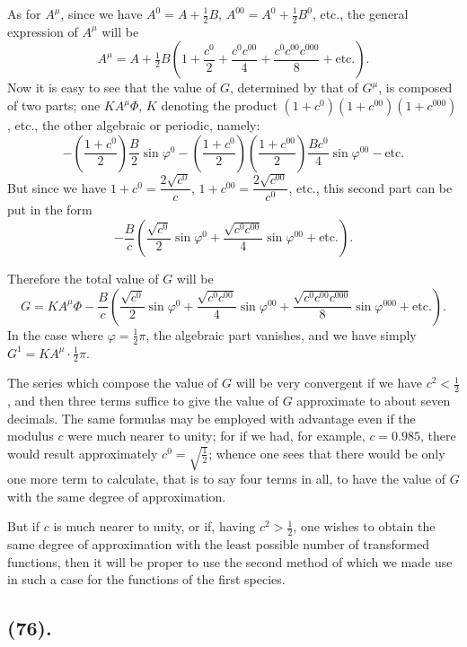 \documentclass{article}
\begin{document}
As for $A^{\mu}$, since we have $A^{0}=A+\frac{1}{2}B$, $A^{00}=A^{0}+\frac{1}{2}B^{0}$, etc., the general expression of $A^{\mu}$ will be
\[ A^{\mu}=A+\tfrac{1}{2}B\left(1+\frac{c^{0}}{2}+\frac{c^{0}c^{00}}{4}+\frac{c^{0}c^{00}c^{000}}{8}+\text{etc.}\right). \]
Now it is easy to see that the value of $G$, determined by that of $G^{\mu}$, is composed of two parts; one $KA^{\mu}\Phi$, $K$ denoting the product $(1+c^{0})(1+c^{00})(1+c^{000})$, etc., the other algebraic or periodic, namely:
\[ -\left(\frac{1+c^{0}}{2}\right)\frac{B}{2}\sin\varphi^{0}-\left(\frac{1+c^{0}}{2}\right)\left(\frac{1+c^{00}}{2}\right)\frac{Bc^{0}}{4}\sin\varphi^{00}-\text{etc.} \]
But since we have $1+c^{0}=\dfrac{2\sqrt{c^{0}}}{c}$, $1+c^{00}=\dfrac{2\sqrt{c^{00}}}{c^{0}}$, etc., this second part can be put in the form
\[ -\frac{B}{c}\left(\frac{\sqrt{c^{0}}}{2}\sin\varphi^{0}+\frac{\sqrt{c^{0}c^{00}}}{4}\sin\varphi^{00}+\text{etc.}\right). \]

Therefore the total value of $G$ will be
\[ G=KA^{\mu}\Phi-\frac{B}{c}\left(\frac{\sqrt{c^{0}}}{2}\sin\varphi^{0}+\frac{\sqrt{c^{0}c^{00}}}{4}\sin\varphi^{00}+\frac{\sqrt{c^{0}c^{00}c^{000}}}{8}\sin\varphi^{000}+\text{etc.}\right). \]
In the case where $\varphi=\frac{1}{2}\pi$, the algebraic part vanishes, and we have simply $G^{1}=KA^{\mu}\cdot\frac{1}{2}\pi$.

The series which compose the value of $G$ will be very convergent if we have $c^{2}<\frac{1}{2}$, and then three terms suffice to give the value of $G$ approximate to about seven decimals. The same formulas may be employed with advantage even if the modulus $c$ were much nearer to unity; for if we had, for example, $c=0.985$, there would result approximately $c^{0}=\sqrt{\frac{1}{2}}$; whence one sees that there would be only one more term to calculate, that is to say four terms in all, to have the value of $G$ with the same degree of approximation.

But if $c$ is much nearer to unity, or if, having $c^{2}>\frac{1}{2}$, one wishes to obtain the same degree of approximation with the least possible number of transformed functions, then it will be proper to use the second method of which we made use in such a case for the functions of the first species.

\subsection*{(76).}
\end{document}

